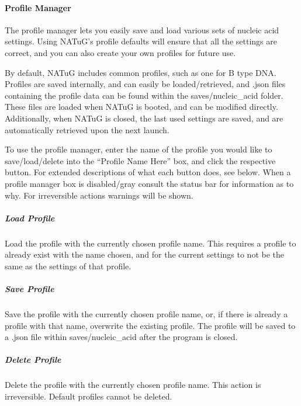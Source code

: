 \documentclass[titlepage]{article}
\begin{document}
	\paragraph{Profile Manager}
	The profile manager lets you easily save and load various sets of nucleic acid settings. Using NATuG’s profile defaults will ensure that all the settings are correct, and you can also create your own profiles for future use.
	
	By default, NATuG includes common profiles, such as one for B type DNA. Profiles are saved internally, and can easily be loaded/retrieved, and .json files containing the profile data can be found within the saves/nucleic\_acid folder. These files are loaded when NATuG is booted, and can be modified directly. Additionally, when NATuG is closed, the last used settings are saved, and are automatically retrieved upon the next launch.
	
	To use the profile manager, enter the name of the profile you would like to save/load/delete into the “Profile Name Here” box, and click the respective button. For extended descriptions of what each button does, see below. When a profile manager box is disabled/gray consult the status bar for information as to why. For irreversible actions warnings will be shown.
	
	\subparagraph{Load Profile}
	Load the profile with the currently chosen profile name. This requires a profile to already exist with the name chosen, and for the current settings to not be the same as the settings of that profile.
	
	\subparagraph{Save Profile}
	Save the profile with the currently chosen profile name, or, if there is already a profile with that name, overwrite the existing profile. The profile will be saved to a .json file within saves/nucleic\_acid after the program is closed.
	
	\subparagraph{Delete Profile}
	Delete the profile with the currently chosen profile name. This action is irreversible. Default profiles cannot be deleted.
	
\end{document}
